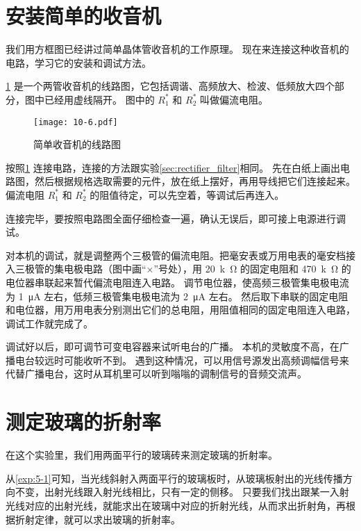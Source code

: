 \section{安装简单的收音机}
我们用方框图已经讲过简单晶体管收音机的工作原理。
现在来连接这种收音机的电路，学习它的安装和调试方法。

\cref{fig:10-6} 是一个两管收音机的线路图，它包括调谐、高频放大、检波、低频放大四个部分，图中已经用虚线隔开。
图中的 $R_1^*$ 和 $R_2^*$ 叫做偏流电阻。
\begin{figure}
  \texttt{[image: 10-6.pdf]}
  \caption{简单收音机的线路图}\label{fig:10-6}
\end{figure}

按照\cref{fig:10-6} 连接电路，连接的方法跟实验\ref{sec:rectifier_filter}相同。
先在白纸上画出电路图，然后根据规格选取需要的元件，放在纸上摆好，再用导线把它们连接起来。
偏流电阻 $R_1^*$ 和 $R_2^*$ 的阻值待定，可以先空着，等调试后再连入。

连接完毕，要按照电路图全面仔细检查一遍，确认无误后，即可接上电源进行调试。

对本机的调试，就是调整两个三极管的偏流电阻。把毫安表或万用电表的毫安档接入三极管的集电极电路（图中画“$\times$”号处），用 \qty{20}{k\ohm} 的固定电阻和 \qty{470}{k\ohm} 的电位器串联起来暂代偏流电阻连入电路。
调节电位器，使高频三极管集电极电流为 \qty{1}{\micro A} 左右，低频三极管集电极电流为 \qty{2}{\micro A} 左右。
然后取下串联的固定电阻和电位器，用万用电表分别测出它们的总电阻，用阻值相同的固定电阻连入电路，调试工作就完成了。

调试好以后，即可调节可变电容器来试听电台的广播。
本机的灵敏度不高，在广播电台较远时可能收听不到。
遇到这种情况，可以用信号源发出高频调幅信号来代替广播电台，这时从耳机里可以听到嗡嗡的调制信号的音频交流声。

\section{测定玻璃的折射率}

在这个实验里，我们用两面平行的玻璃砖来测定玻璃的折射率。

从\cref{exp:5-1}可知，当光线斜射入两面平行的玻璃板时，从玻璃板射出的光线传播方向不变，出射光线跟入射光线相比，只有一定的侧移。
只要我们找出跟某一入射光线对应的出射光线，就能求出在玻璃中对应的折射光线，从而求出折射角，再根据折射定律，就可以求出玻璃的折射率。

